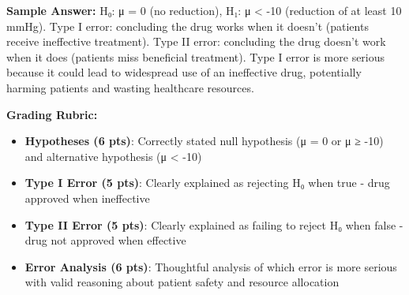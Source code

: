 \documentclass[11pt,letterpaper]{exam}
\begin{document}
\begin{questions}
\textbf{Sample Answer:} H₀: μ = 0 (no reduction), H₁: μ < -10 (reduction of at least 10 mmHg). Type I error: concluding the drug works when it doesn't (patients receive ineffective treatment). Type II error: concluding the drug doesn't work when it does (patients miss beneficial treatment). Type I error is more serious because it could lead to widespread use of an ineffective drug, potentially harming patients and wasting healthcare resources.

\textbf{Grading Rubric:}
\begin{itemize}
  \item \textbf{Hypotheses (6 pts)}: Correctly stated null hypothesis (μ = 0 or μ ≥ -10) and alternative hypothesis (μ < -10)
  \item \textbf{Type I Error (5 pts)}: Clearly explained as rejecting H₀ when true - drug approved when ineffective
  \item \textbf{Type II Error (5 pts)}: Clearly explained as failing to reject H₀ when false - drug not approved when effective
  \item \textbf{Error Analysis (6 pts)}: Thoughtful analysis of which error is more serious with valid reasoning about patient safety and resource allocation
\end{itemize}


\end{questions}
\end{document}
